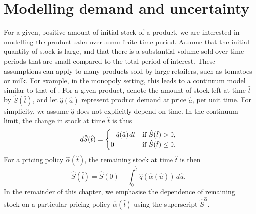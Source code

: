 \documentclass[main.tex]{subfiles}
\begin{document}
\section{Modelling demand and uncertainty}\label{sec:cts_modelling}
For a given, positive amount of initial stock of a product, we are interested in
modelling the product sales over some finite time period.
Assume that the initial quantity of stock is large, and that there is a
substantial volume sold over time periods that are small compared to the total
period of interest. These assumptions can apply to many products sold
by large retailers, such as tomatoes or milk. For example, in the monopoly setting, this leads to
a continuum model similar to that of \citet{kalish1983monopolist}.
For a given product, denote the amount of stock left at time $\hat{t}$ by $\hat{S}(\hat{t})$,
and let $\hat{q}(\hat{a})$ represent product demand at price $\hat{a}$, per unit
time.
For simplicity, we assume $\hat{q}$ does not explicitly depend on time.
In the continuum limit, the change in  stock at time $\hat{t}$
is thus
\begin{equation}
  d\hat{S}(\hat{t})=
  \begin{cases}
    -\hat{q}(\hat{a})\,dt & \textnormal{if } \hat{S}(\hat{t})>0,\\
    0& \textnormal{if }  \hat{S}(\hat{t})\leq 0.
  \end{cases}
\end{equation}
For a pricing policy
$\hat{\alpha}(\hat{t})$, the remaining stock at time $\hat{t}$ is then
\begin{equation}
  \hat{S}(\hat{t})=\hat{S}(0)-\int_0^{\hat{t}}\hat{q}(\hat{\alpha}(\hat{u}))\,d\hat{u}.
\end{equation}
In the remainder of this chapter,
we emphasise the dependence of remaining stock on a particular
pricing policy $\hat{\alpha}(\hat{t})$ using the superscript $\hat{S}^{\hat{\alpha}}$.
\end{document}
